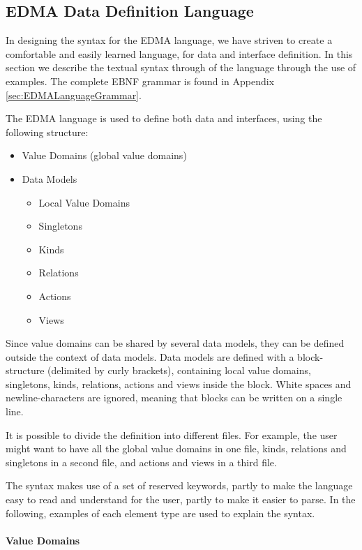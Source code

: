
\subsection{EDMA Data Definition Language\label{sec:DataDefLanguage}}

In designing the syntax for the EDMA language, we have striven to
create a comfortable and easily learned language, for data and interface
definition. In this section we describe the textual syntax through
of the language through the use of examples. The complete EBNF grammar
is found in Appendix \ref{sec:EDMALanguageGrammar}.

The EDMA language is used to define both data and interfaces, using
the following structure:
\begin{itemize}
\item Value Domains (global value domains)
\item Data Models

\begin{itemize}
\item Local Value Domains
\item Singletons
\item Kinds
\item Relations
\item Actions
\item Views
\end{itemize}
\end{itemize}
Since value domains can be shared by several data models, they can
be defined outside the context of data models. Data models are defined
with a block-structure (delimited by curly brackets), containing local
value domains, singletons, kinds, relations, actions and views inside
the block. White spaces and newline-characters are ignored, meaning
that blocks can be written on a single line.

It is possible to divide the definition into different files. For
example, the user might want to have all the global value domains
in one file, kinds, relations and singletons in a second file, and
actions and views in a third file. 

The syntax makes use of a set of reserved keywords, partly to make
the language easy to read and understand for the user, partly to make
it easier to parse. In the following, examples of each element type
are used to explain the syntax.


\paragraph{Value Domains}


